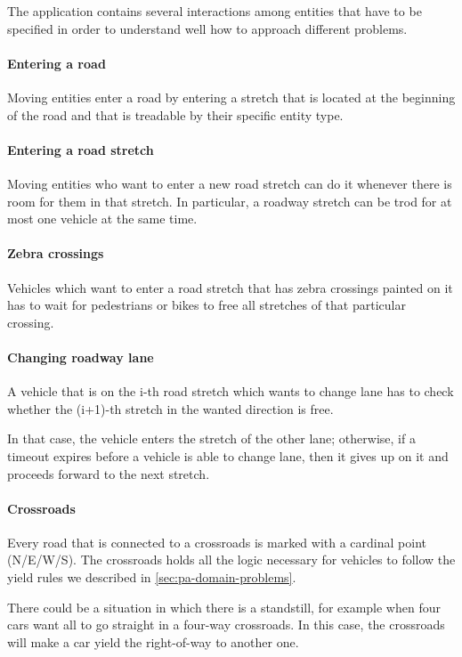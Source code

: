 
The application contains several interactions among entities that have to be
specified in order to understand well how to approach different problems.

\paragraph{Entering a road} Moving entities enter a road by entering a stretch
that is located at the beginning of the road and that is treadable by their
specific entity type.

\paragraph{Entering a road stretch} Moving entities who want to enter a new
road stretch can do it whenever there is room for them in that stretch. In
particular, a roadway stretch can be trod for at most one vehicle at the same
time.

\paragraph{Zebra crossings} Vehicles which want to enter a road stretch that
has zebra crossings painted on it has to wait for pedestrians or bikes to free
all stretches of that particular crossing.

\paragraph{Changing roadway lane} A vehicle that is on the i-th road stretch
which wants to change lane has to check whether the (i+1)-th stretch in the
wanted direction is free.

In that case, the vehicle enters the stretch of the other lane; otherwise, if a
timeout expires before a vehicle is able to change lane, then it gives up on
it and proceeds forward to the next stretch.

\paragraph{Crossroads} Every road that is connected to a crossroads is marked
with a cardinal point (N/E/W/S). The crossroads holds all the logic necessary
for vehicles to follow the yield rules we described in
\ref{sec:pa-domain-problems}.

There could be a situation in which there is a standstill, for example when
four cars want all to go straight in a four-way crossroads. In this case, the
crossroads will make a car yield the right-of-way to another one.

